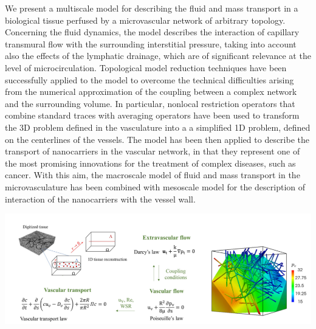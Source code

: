 \documentclass{article}
\begin{document}



{
We present a multiscale model for describing the fluid and mass transport
in a biological tissue perfused by a microvascular network of arbitrary topology.
Concerning the fluid dynamics, the model describes the interaction of capillary
transmural flow with the surrounding interstitial pressure, taking into account
also the effects of the lymphatic drainage, which are of significant relevance at
the level of microcirculation. Topological model reduction techniques have been
successfully applied to the model to overcome the technical difficulties arising
from the numerical approximation of the coupling between a complex network
and the surrounding volume. In particular, nonlocal restriction operators that
combine standard traces with averaging operators have been used to transform
the 3D problem defined in the vasculature into a a simplified 1D problem, defined on the centerlines of the vessels.
The model has been then applied to describe the transport of nanocarriers in
the vascular network, in that they represent one of the most promising innovations for the treatment of complex diseases, such as cancer. With this aim,
the macroscale model of fluid and mass transport in the microvasculature has
been combined with mesoscale model for the description of interaction of the
nanocarriers with the vessel wall.

\begin{center}
\includegraphics[width=1.0\textwidth]{image1.png} 

\end{center}

}
\end{document}
